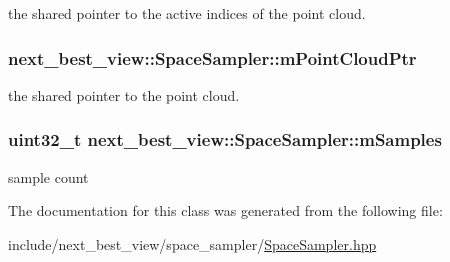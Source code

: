 the shared pointer to the active indices of the point cloud. 

\hypertarget{classnext__best__view_1_1SpaceSampler_a8e4e79adc565f8620e2b77349875f744}{
\subsubsection[{m\-Point\-Cloud\-Ptr}]{ {\bf next\-\_\-best\-\_\-view\-::\-Space\-Sampler\-::m\-Point\-Cloud\-Ptr}}}\label{classnext__best__view_1_1SpaceSampler_a8e4e79adc565f8620e2b77349875f744}


the shared pointer to the point cloud. 

\hypertarget{classnext__best__view_1_1SpaceSampler_adae3c611301e1f2775ef02f2dd2b07f5}{
\subsubsection[{m\-Samples}]{\setlength{\rightskip}{0pt plus 5cm}uint32\-\_\-t {\bf next\-\_\-best\-\_\-view\-::\-Space\-Sampler\-::m\-Samples}}}\label{classnext__best__view_1_1SpaceSampler_adae3c611301e1f2775ef02f2dd2b07f5}


sample count 



\-The documentation for this class was generated from the following file\-:\begin{DoxyCompactItemize}
\item 
include/next\-\_\-best\-\_\-view/space\-\_\-sampler/\hyperlink{SpaceSampler_8hpp}{\-Space\-Sampler.\-hpp}\end{DoxyCompactItemize}
